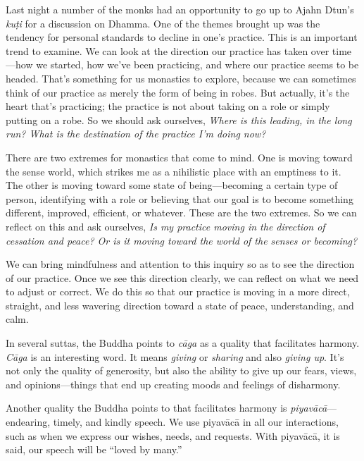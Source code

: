 
Last night a number of the monks had an opportunity to go up to Ajahn 
Dtun's \emph{kuṭi} for a discussion on Dhamma. One of the themes 
brought up was the tendency for personal standards to decline in one's 
practice. This is an important trend to examine. We can look at the 
direction our practice has taken over time---how we started, how we've 
been practicing, and where our practice seems to be headed. That's 
something for us monastics to explore, because we can sometimes think 
of our practice as merely the form of being in robes. But actually, 
it's the heart that's practicing; the practice is not about taking on a 
role or simply putting on a robe. So we should ask ourselves, 
\emph{Where is this leading, in the long run? What is the destination 
of the practice I'm doing now?}

There are two extremes for monastics that come to mind. One is moving 
toward the sense world, which strikes me as a nihilistic place with an 
emptiness to it. The other is moving toward some state of 
being---becoming a certain type of person, identifying with a role or 
believing that our goal is to become something different, improved, 
efficient, or whatever. These are the two extremes. So we can reflect 
on this and ask ourselves, \emph{Is my practice moving in the direction 
of cessation and peace? Or is it moving toward the world of the senses 
or becoming?}

We can bring mindfulness and attention to this inquiry so as to see the 
direction of our practice. Once we see this direction clearly, we can 
reflect on what we need to adjust or correct. We do this so that our 
practice is moving in a more direct, straight, and less wavering 
direction toward a state of peace, understanding, and calm.


In several suttas, the Buddha points to \emph{cāga} as a quality that 
facilitates harmony. \emph{Cāga} is an interesting word. It means 
\emph{giving} or \emph{sharing} and also \emph{giving up}. It's not 
only the quality of generosity, but also the ability to give up our 
fears, views, and opinions---things that end up creating moods and 
feelings of disharmony.

Another quality the Buddha points to that facilitates harmony is 
\emph{piyavācā}---endearing, timely, and kindly speech. We use 
piyavācā in all our interactions, such as when we express our wishes, 
needs, and requests. With piyavācā, it is said, our speech will be 
``loved by many.''

